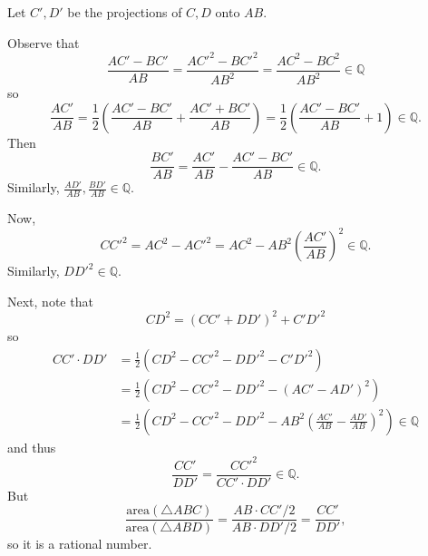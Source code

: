 Let $C',D'$ be the projections of $C,D$ onto $AB$.

Observe that \[\frac{AC'-BC'}{AB}=\frac{AC'^2-BC'^2}{AB^2}=\frac{AC^2-BC^2}{AB^2}\in\mathbb{Q}\] so \[\frac{AC'}{AB}=\frac{1}{2}\left(\frac{AC'-BC'}{AB}+\frac{AC'+BC'}{AB}\right)=\frac{1}{2}\left(\frac{AC'-BC'}{AB}+1\right)\in\mathbb{Q}.\] Then \[\frac{BC'}{AB}=\frac{AC'}{AB}-\frac{AC'-BC'}{AB}\in\mathbb{Q}.\] Similarly, $\frac{AD'}{AB},\frac{BD'}{AB}\in\mathbb{Q}$.

Now, \[CC'^2=AC^2-AC'^2=AC^2-AB^2\left(\frac{AC'}{AB}\right)^2\in\mathbb{Q}.\] Similarly, $DD'^2\in\mathbb{Q}$.

Next, note that \[CD^2=\left(CC'+DD'\right)^2+C'D'^2\] so
\begin{align*}
	CC'\cdot DD'&=\frac{1}{2}\left(CD^2-CC'^2-DD'^2-C'D'^2\right)\\
	&=\frac{1}{2}\left(CD^2-CC'^2-DD'^2-\left(AC'-AD'\right)^2\right)\\
	&=\frac{1}{2}\left(CD^2-CC'^2-DD'^2-AB^2\left(\frac{AC'}{AB}-\frac{AD'}{AB}\right)^2\right)\in\mathbb{Q}
\end{align*}
and thus \[\frac{CC'}{DD'}=\frac{CC'^2}{CC'\cdot DD'}\in\mathbb{Q}.\] But \[\frac{\mathrm{area}\left(\triangle{ABC}\right)}{\mathrm{area}\left(\triangle{ABD}\right)}=\frac{AB\cdot CC'/2}{AB\cdot DD'/2}=\frac{CC'}{DD'},\] so it is a rational number.